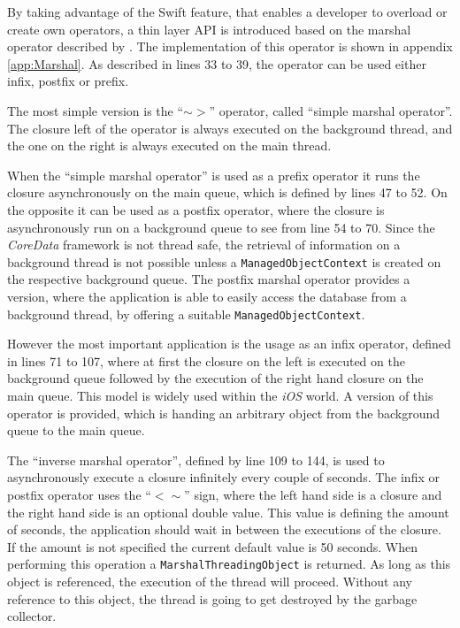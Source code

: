 By taking advantage of the \gls{Swift} feature, that enables a developer to overload or create own operators, a thin layer \gls{API} is introduced based on the marshal operator described by \cite{Smith:2014aa}. The implementation of this operator is shown in appendix \vref{app:Marshal}. As described in lines 33 to 39, the operator can be used either infix, postfix or prefix.

The most simple version is the \enquote{$\sim>$} operator, called \enquote{simple marshal operator}. The closure left of the operator is always executed on the background thread, and the one on the right is always executed on the main thread. 

When the \enquote{simple marshal operator} is used as a prefix operator it runs the closure asynchronously on the main queue, which is defined by lines 47 to 52. On the opposite it can  be used as a postfix operator, where the closure is asynchronously run on a background queue to see from line 54 to 70. Since the \emph{CoreData} framework is not thread safe, the retrieval of information on a background thread is not possible unless a \texttt{ManagedObjectContext} is created on the respective background queue. The postfix marshal operator provides a version, where the application is able to easily access the database from a background thread, by offering a suitable \texttt{ManagedObjectContext}.

However the most important application is the usage as an infix operator, defined in lines 71 to 107, where at first the closure on the left is executed on the background queue followed by the execution of the right hand closure on the main queue. This model is widely used within the \emph{iOS} world. A version of this operator is provided, which is handing an arbitrary object from the background queue to the main queue.

The \enquote{inverse marshal operator}, defined by line 109 to 144, is used to asynchronously execute a closure infinitely every couple of seconds. The infix or postfix operator uses the \enquote{$<\sim$} sign, where the left hand side is a closure and the right hand side is an optional double value. This value is defining the amount of seconds, the application should wait in between the executions of the closure. If the amount is not specified the current default value is 50 seconds. When performing this operation a \texttt{MarshalThreadingObject} is returned. As long as this object is referenced, the execution of the thread will proceed. Without any reference to this object, the thread is going to get destroyed by the garbage collector.

